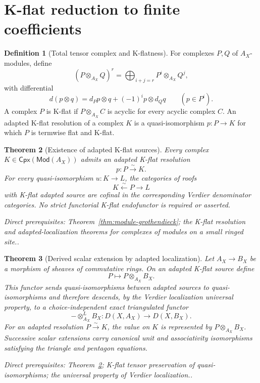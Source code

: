 \documentclass[10pt]{article}
\newtheorem{theorem}{Theorem}[section]
\theoremstyle{definition}
\newtheorem{definition}[theorem]{Definition}
\newcommand{\depends}[1]{\par\smallskip\noindent\textit{Direct prerequisites:} #1.}
\begin{document}
\section{K-flat reduction to finite coefficients}

\begin{definition}[Total tensor complex and K-flatness]
\label{def:kflat}
For complexes $P,Q$ of $A_X$-modules, define
\[
 (P\otimes_{A_X}Q)^r=\bigoplus_{i+j=r}P^i\otimes_{A_X}Q^j,
\]
with differential
\[
 d(p\otimes q)=d_Pp\otimes q+(-1)^i p\otimes d_Qq
 \qquad(p\in P^i).
\]
A complex $P$ is K-flat if $P\otimes_{A_X}C$ is acyclic for every acyclic
complex $C$.  An adapted K-flat resolution of a complex $K$ is a
quasi-isomorphism $p:P\to K$ for which $P$ is termwise flat and K-flat.
\end{definition}

\begin{theorem}[Existence of adapted K-flat sources]\label{thm:kflat-existence}
Every complex $K\in\mathsf{Cpx}(\mathsf{Mod}(A_X))$ admits an adapted
K-flat resolution
\[
 p:P\xrightarrow{\sim}K.
\]
For every quasi-isomorphism $u:K\to L$, the categories of roofs
\[
 K\xleftarrow{\sim}P\longrightarrow L
\]
with K-flat adapted source are cofinal in the corresponding Verdier
denominator categories.  No strict functorial K-flat endofunctor is required
or asserted.
\depends{Theorem~\ref{thm:module-grothendieck}; the K-flat resolution
and adapted-localization theorems for complexes of modules on a small
ringed site.}
\end{theorem}

\begin{theorem}[Derived scalar extension by adapted localization]
\label{thm:derived-scalar-extension}
Let $A_X\to B_X$ be a morphism of sheaves of commutative rings.  On an
adapted K-flat source define
\[
 P\longmapsto P\otimes_{A_X}B_X.
\]
This functor sends quasi-isomorphisms between adapted sources to
quasi-isomorphisms and therefore descends, by the Verdier localization
universal property, to a choice-independent exact triangulated functor
\[
 -\otimes^L_{A_X}B_X:D(X,A_X)\longrightarrow D(X,B_X).
\]
For an adapted resolution $P\xrightarrow{\sim}K$, the value on $K$ is
represented by $P\otimes_{A_X}B_X$.  Successive scalar extensions carry
canonical unit and associativity isomorphisms satisfying the triangle and
pentagon equations.
\depends{Theorem~\ref{thm:kflat-existence}; K-flat tensor preservation of
quasi-isomorphisms; the universal property of Verdier localization.}
\end{theorem}
\end{document}
